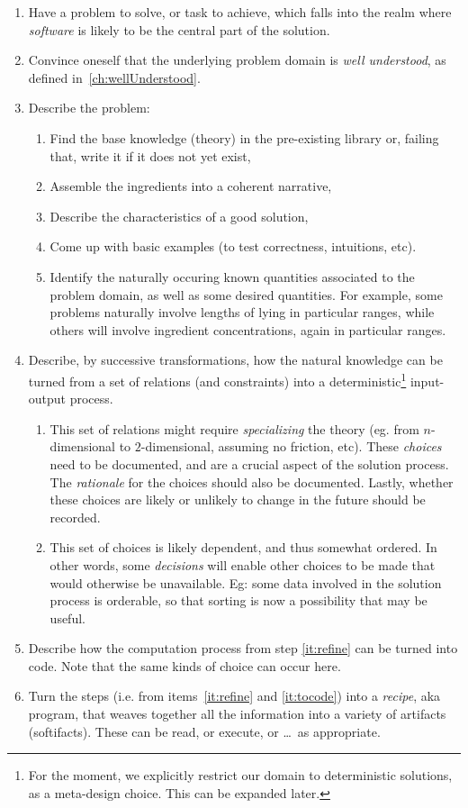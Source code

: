 \documentclass[10pt,twoside,onecolumn,openany,letterpaper]{memoir}
\begin{document}
\begin{enumerate}
\item\label{it:problem} Have a problem to solve, or task to achieve, which
falls into the realm where \emph{software} is likely to be the central part of
the solution.
\item\label{it:understood} Convince oneself that the underlying problem domain
is \emph{well understood}, as defined in~\autoref{ch:wellUnderstood}.
\item\label{it:probdesc} Describe the problem:
  \begin{enumerate}
  \item Find the base knowledge (theory) in the pre-existing library
    or, failing that, write it if it does not yet exist,
  \item Assemble the ingredients into a coherent narrative,
  \item Describe the characteristics of a good solution,
  \item Come up with basic examples (to test correctness, intuitions, etc).
  \item Identify the naturally occuring known quantities associated to the
    problem domain, as well as some desired quantities. For example,
    some problems naturally involve lengths of lying in particular
    ranges, while others will involve ingredient concentrations, again
    in particular ranges.
  \end{enumerate}
\item\label{it:refine} Describe, by successive transformations, how the natural
knowledge can be turned from a set of relations (and constraints) into a
deterministic\footnote{For the moment, we explicitly restrict our domain to
deterministic solutions, as a meta-design choice. This can be expanded later.}
input-output process.
  \begin{enumerate}
  \item This set of relations might require \emph{specializing} the
    theory (eg. from $n$-dimensional to $2$-dimensional, assuming no
    friction, etc).  These \emph{choices} need to be documented, and are
    a crucial aspect of the solution process. The \emph{rationale} for the
    choices should also be documented. Lastly, whether these choices are
    likely or unlikely to change in the future should be recorded.
  \item This set of choices is likely dependent, and thus somewhat ordered.
  In other words, some \emph{decisions} will enable other choices to be
  made that would otherwise be unavailable. Eg: some data involved in the
  solution process is orderable, so that sorting is now a possibility that
  may be useful.
  \end{enumerate}
\item\label{it:tocode} Describe how the computation process from step
\ref{it:refine} can be turned into code. Note that the same kinds of choice
can occur here.
\item\label{it:recipe} Turn the steps (i.e. from items~\ref{it:refine} and
\ref{it:tocode}) into a \emph{recipe}, aka program, that weaves together
all the information into a variety of artifacts (softifacts). These can
be read, or execute, or \ldots\ as appropriate.
\end{enumerate}
\end{document}
